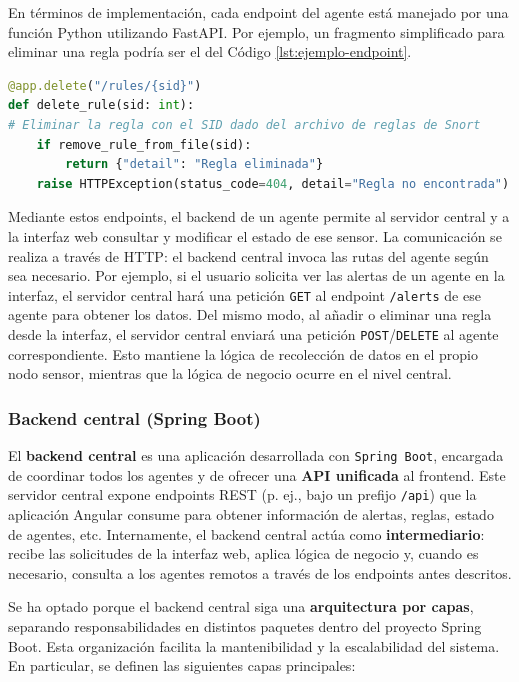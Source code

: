 \documentclass[11pt,a4paper,twoside]{report}
\begin{document}
En términos de implementación, cada endpoint del agente está manejado por una función Python utilizando FastAPI. Por ejemplo, un fragmento simplificado para eliminar una regla podría ser el del Código \ref{lst:ejemplo-endpoint}.

\begin{lstlisting}[language=Python, caption={Fragmento del código que maneja cada endpoint.}, label={lst:ejemplo-endpoint}]
@app.delete("/rules/{sid}")
def delete_rule(sid: int):
# Eliminar la regla con el SID dado del archivo de reglas de Snort
	if remove_rule_from_file(sid):
		return {"detail": "Regla eliminada"}
	raise HTTPException(status_code=404, detail="Regla no encontrada")
\end{lstlisting}

Mediante estos endpoints, el backend de un agente permite al servidor central y a la interfaz web consultar y modificar el estado de ese sensor. La comunicación se realiza a través de HTTP: el backend central invoca las rutas del agente según sea necesario. Por ejemplo, si el usuario solicita ver las alertas de un agente en la interfaz, el servidor central hará una petición \texttt{GET} al endpoint \texttt{/alerts} de ese agente para obtener los datos. Del mismo modo, al añadir o eliminar una regla desde la interfaz, el servidor central enviará una petición \texttt{POST}/\texttt{DELETE} al agente correspondiente. Esto mantiene la lógica de recolección de datos en el propio nodo sensor, mientras que la lógica de negocio ocurre en el nivel central.

\subsubsection{Backend central (Spring Boot)}

El \textbf{backend central} es una aplicación desarrollada con \texttt{Spring Boot}, encargada de coordinar todos los agentes y de ofrecer una \textbf{API unificada} al frontend. Este servidor central expone endpoints REST (p. ej., bajo un prefijo \texttt{/api}) que la aplicación Angular consume para obtener información de alertas, reglas, estado de agentes, etc. Internamente, el backend central actúa como \textbf{intermediario}: recibe las solicitudes de la interfaz web, aplica lógica de negocio y, cuando es necesario, consulta a los agentes remotos a través de los endpoints antes descritos.\newline

Se ha optado porque el backend central siga una \textbf{arquitectura por capas}, separando responsabilidades en distintos paquetes dentro del proyecto Spring Boot. Esta organización facilita la mantenibilidad y la escalabilidad del sistema. En particular, se definen las siguientes capas principales:
\end{document}
